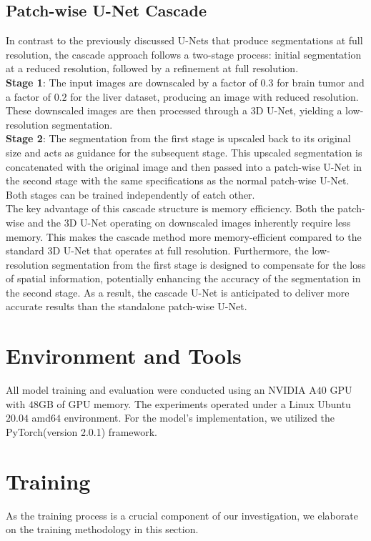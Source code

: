 \subsection{Patch-wise U-Net Cascade}
In contrast to the previously discussed U-Nets that produce segmentations at full resolution, the cascade approach follows a two-stage process:
initial segmentation at a reduced resolution, followed by a refinement at full resolution.\\[1ex]
\textbf{Stage 1}:
The input images are downscaled by a factor of $0.3$ for brain tumor and a factor of $0.2$ for the liver dataset, producing an image with reduced resolution. These downscaled images are then processed through a $3$D U-Net,
yielding a low-resolution segmentation.\\[1ex]
\textbf{Stage 2}:
The segmentation from the first stage is upscaled back to its original size and acts as guidance for the subsequent stage.
This upscaled segmentation is concatenated with the original image and then passed into a patch-wise U-Net in the second stage with the same specifications as the normal patch-wise U-Net.
Both stages can be trained independently of eatch other.\\

\noindent The key advantage of this cascade structure is memory efficiency. Both the patch-wise and the $3$D U-Net operating on downscaled images inherently require less memory.
This makes the cascade method more memory-efficient compared to the standard $3$D U-Net that operates at full resolution. Furthermore,
the low-resolution segmentation from the first stage is designed to compensate for the loss of spatial information, potentially enhancing the accuracy of the segmentation in the second stage.
As a result, the cascade U-Net is anticipated to deliver more accurate results than the standalone patch-wise U-Net.

\section{Environment and Tools}
All model training and evaluation were conducted using an NVIDIA A$40$ GPU with $48$GB of GPU memory. The experiments operated under a Linux Ubuntu $20.04$ amd$64$ environment. For the model's implementation,
we utilized the PyTorch(version 2.0.1) framework.

\section{Training}
As the training process is a crucial component of our investigation, we elaborate on the training methodology in this section.
